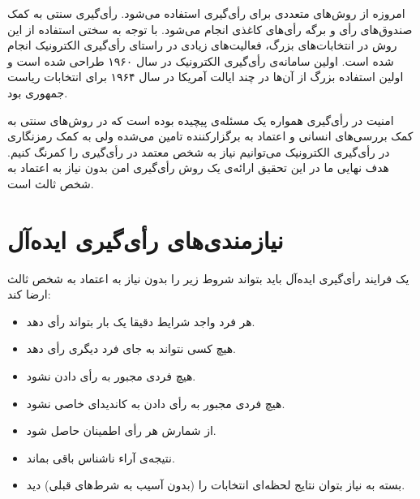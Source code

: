 \par
امروزه از روش‌های متعددی برای رأی‌گیری استفاده می‌شود. رأی‌گیری سنتی به کمک صندوق‌های رأی‌ و برگه‌ رأی‌های کاغذی انجام می‌شود. با توجه به سختی استفاده از این روش در انتخابات‌های بزرگ، فعالیت‌های زیادی در راستای رأی‌گیری الکترونیک انجام شده است. اولین سامانه‌ی رأی‌گیری الکترونیک در سال ۱۹۶۰ طراحی شده است و اولین استفاده‌ بزرگ از آن‌ها در چند ایالت آمریکا در سال ۱۹۶۴ برای انتخابات ریاست جمهوری بود. 

\par
امنیت در رأی‌گیری همواره یک مسئله‌ی پیچیده بوده است که در روش‌های سنتی به کمک بررسی‌های انسانی و اعتماد به برگزارکننده تامین می‌شده ولی به کمک رمزنگاری در رأی‌گیری الکترونیک می‌توانیم نیاز به شخص معتمد در رأی‌گیری را کمرنگ کنیم. هدف نهایی ما در این تحقیق ارائه‌ی یک روش رأی‌گیری امن بدون نیاز به اعتماد به شخص ثالث است. 
\section{نیازمندی‌های رأی‌گیری ایده‌آل}

یک فرایند‌ رأی‌گیری ایده‌آل باید بتواند شروط زیر را بدون نیاز به اعتماد به شخص ثالث ارضا کند:
\begin{itemize}
	\item 
	هر فرد واجد شرایط دقیقا یک بار بتواند رأی دهد.
	\item 
	هیچ کسی نتواند به جای فرد دیگری رأی دهد.
	\item 
  	هیچ فردی مجبور به رأی دادن نشود.
  	\item 
  	هیچ فردی مجبور به رأی دادن به کاندیدای خاصی نشود.
  	\item 
  	از شمارش هر رأی اطمینان حاصل شود.
  	\item 
    نتیجه‌ی آراء ناشناس  باقی بماند. 
  	\item 
  	بسته به نیاز بتوان نتایج لحظه‌ای انتخابات را (بدون آسیب به شرط‌های قبلی) دید.
\end{itemize}

